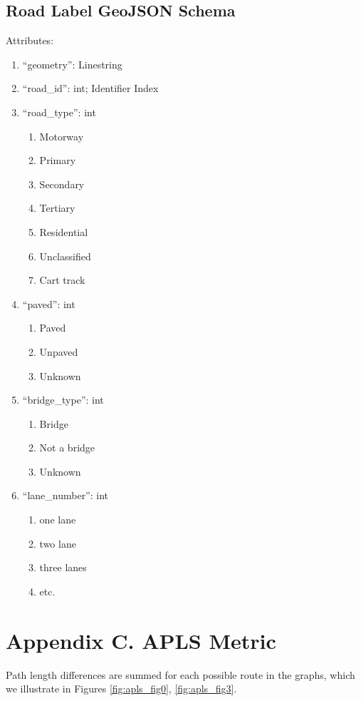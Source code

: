 \documentclass{article}
\begin{document}
\subsection{Road Label GeoJSON Schema}
Attributes:
\begin{enumerate}
	\item ``geometry'': Linestring
	\item ``road\_id'': int; Identifier Index
	\item ``road\_type'': int
	\begin{enumerate}
		\item Motorway
		\item Primary
		\item Secondary
		\item Tertiary
		\item Residential
		\item Unclassified
		\item Cart track
	\end{enumerate}
	\item ``paved'': int
	\begin{enumerate}
		\item Paved
		\item Unpaved
		\item Unknown
	\end{enumerate}
	\item ``bridge\_type'': int
	\begin{enumerate}
		\item Bridge
		\item Not a bridge
		\item Unknown
	\end{enumerate}
	\item ``lane\_number'': int
	\begin{enumerate}
		\item one lane
		\item two lane
		\item three lanes
		\item etc.
	\end{enumerate}
\end{enumerate}



\newpage

\section{Appendix C.   APLS Metric}

Path length differences are summed for each possible route in the graphs, which we illustrate in Figures \ref{fig:apls_fig0}, \ref{fig:apls_fig3}.
\end{document}
